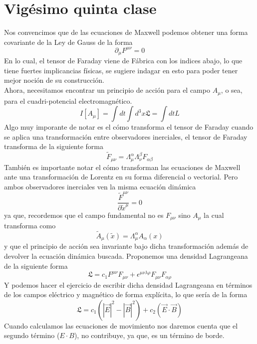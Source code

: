 \documentclass[../main.tex]{subfiles}
\begin{document}
\section{Vigésimo quinta clase}
Nos convencimos que de las ecuaciones de Maxwell podemos obtener una forma covariante de la Ley de Gauss de la forma
\begin{equation*}
  \partial_\mu F^{\mu \nu} = 0 
\end{equation*}
En lo cual, el tensor de Faraday viene de Fábrica con los indices abajo, lo que tiene fuertes implicancias físicas, se sugiere indagar en esto para poder tener mejor noción de su construcción. \\
Ahora, necesitamos encontrar un principio de acción para el campo $A_\mu$, o sea, para el cuadri-potencial electromagnético.
\begin{equation*}
  I[A_\mu] = \int dt \int d^3x \mathfrak{L} = \int dt L
\end{equation*}
Algo muy imporante de notar es el cómo transforma el tensor de Faraday cuando se aplica una transformación entre observadores inerciales, el tensor de Faraday transforma de la siguiente forma
\begin{equation}
  \tilde{F}_{\mu\nu}= \Lambda^\alpha_\mu \Lambda^\beta_\nu F_{\alpha \beta}
 \end{equation}
 También es importante notar el cómo transforman las ecuaciones de Maxwell ante una transformación de Lorentz en su forma diferencial o vectorial. Pero ambos observadores inerciales ven la misma ecuación dinámica 
 \begin{equation*}
   \frac{\tilde{F}^{\mu \nu}}{\partial \tilde{x}^\mu} = 0
 \end{equation*}
 ya que, recordemos que el campo fundamental no es $F_{\mu \nu}$ sino $A_\mu$ la cual transforma como
 \begin{equation*}
   \tilde{A}_\mu(\tilde{x}) = \Lambda^\alpha_\mu A_\alpha(x) 
 \end{equation*}
 y que el principio de acción sea invariante bajo dicha transformación además de devolver la ecuación dinámica buscada. Proponemos una densidad Lagrangeana de la siguiente forma
 \begin{equation*}
   \mathfrak{L} = c_1 F^{\mu \nu}F_{\mu \nu} + \epsilon^{\mu \nu \lambda \rho} F_{\mu \nu} F_{\alpha \rho}
 \end{equation*} 
 Y podemos hacer el ejercicio de escribir dicha densidad Lagrangeana en términos de los campos eléctrico y magnético de forma explícita, lo que sería de la forma
\begin{equation*}
  \mathfrak{L} = c_1 \left( |\vec{E}|^2 - |\vec{B}|^2 \right) + c_2 \left( \vec{E}\cdot \vec{B} \right)
\end{equation*} 
Cuando calculamos las ecuaciones de movimiento nos daremos cuenta que el segundo término ($E\cdot B$), no contribuye, ya que, es un término de borde.
\end{document}
